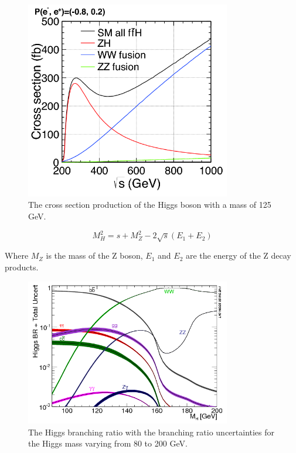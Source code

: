   \begin{figure}[h]
    \centering
    \includegraphics[width = 0.8\textwidth]{Pictures/Higgs/higgs_xsec_P-8_3.png}
    \caption{The cross section production of the Higgs boson with a mass of 125 GeV\cite{Asner2013}.}
    \label{fig:higgsXsec}
  \end{figure}

  \begin{equation}
    M^2_H = s + M^2_Z - 2 \sqrt{s}\left(E_{1} + E_{2}\right)
  \end{equation}

  Where $M_Z$ is the mass of the Z boson, $E_1$ and $E_2$ are the energy of the Z decay products. 
  
  \begin{figure}[h]
    \centering
    \includegraphics[width = 0.8\textwidth]{Pictures/Higgs/BRTotalUncertBands_lm.png}
    \caption{The Higgs branching ratio with the branching ratio uncertainties for the Higgs mass varying from 80 to 200 GeV\cite{Denner:2011mq}.}
    \label{fig:higgsProd}
  \end{figure}

